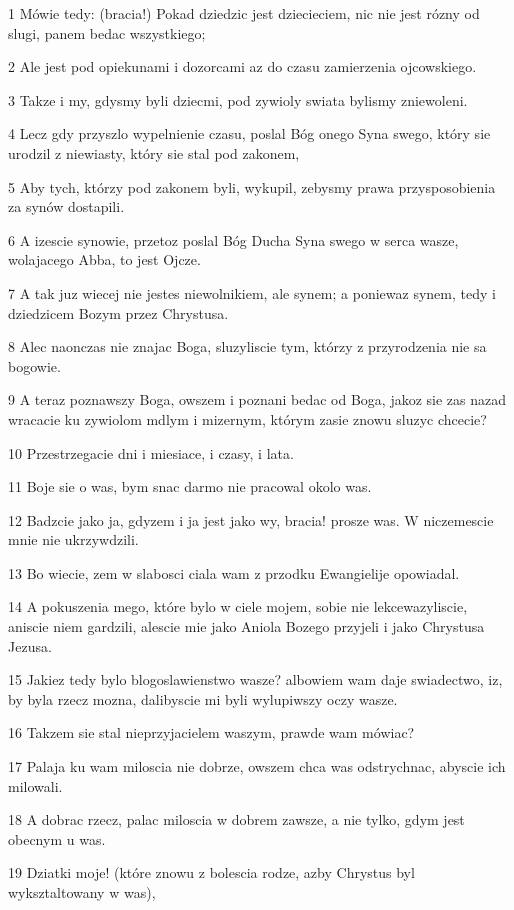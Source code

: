 \par 1 Mówie tedy: (bracia!) Pokad dziedzic jest dziecieciem, nic nie jest rózny od slugi, panem bedac wszystkiego;
\par 2 Ale jest pod opiekunami i dozorcami az do czasu zamierzenia ojcowskiego.
\par 3 Takze i my, gdysmy byli dziecmi, pod zywioly swiata bylismy zniewoleni.
\par 4 Lecz gdy przyszlo wypelnienie czasu, poslal Bóg onego Syna swego, który sie urodzil z niewiasty, który sie stal pod zakonem,
\par 5 Aby tych, którzy pod zakonem byli, wykupil, zebysmy prawa przysposobienia za synów dostapili.
\par 6 A izescie synowie, przetoz poslal Bóg Ducha Syna swego w serca wasze, wolajacego Abba, to jest Ojcze.
\par 7 A tak juz wiecej nie jestes niewolnikiem, ale synem; a poniewaz synem, tedy i dziedzicem Bozym przez Chrystusa.
\par 8 Alec naonczas nie znajac Boga, sluzyliscie tym, którzy z przyrodzenia nie sa bogowie.
\par 9 A teraz poznawszy Boga, owszem i poznani bedac od Boga, jakoz sie zas nazad wracacie ku zywiolom mdlym i mizernym, którym zasie znowu sluzyc chcecie?
\par 10 Przestrzegacie dni i miesiace, i czasy, i lata.
\par 11 Boje sie o was, bym snac darmo nie pracowal okolo was.
\par 12 Badzcie jako ja, gdyzem i ja jest jako wy, bracia! prosze was. W niczemescie mnie nie ukrzywdzili.
\par 13 Bo wiecie, zem w slabosci ciala wam z przodku Ewangielije opowiadal.
\par 14 A pokuszenia mego, które bylo w ciele mojem, sobie nie lekcewazyliscie, aniscie niem gardzili, alescie mie jako Aniola Bozego przyjeli i jako Chrystusa Jezusa.
\par 15 Jakiez tedy bylo blogoslawienstwo wasze? albowiem wam daje swiadectwo, iz, by byla rzecz mozna, dalibyscie mi byli wylupiwszy oczy wasze.
\par 16 Takzem sie stal nieprzyjacielem waszym, prawde wam mówiac?
\par 17 Palaja ku wam miloscia nie dobrze, owszem chca was odstrychnac, abyscie ich milowali.
\par 18 A dobrac rzecz, palac miloscia w dobrem zawsze, a nie tylko, gdym jest obecnym u was.
\par 19 Dziatki moje! (które znowu z bolescia rodze, azby Chrystus byl wyksztaltowany w was),
